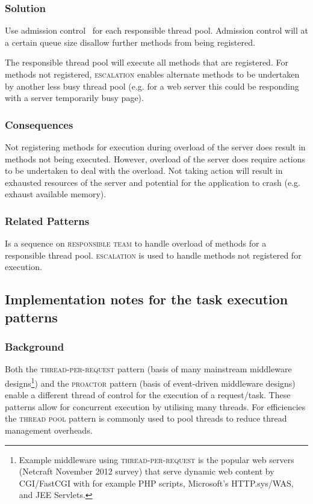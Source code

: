 \documentclass[prodmode]{style/acmlarge}
\begin{document}
\subsubsection*{\textbf{Solution}} Use admission control~\cite{seda} for each
responsible thread pool.  Admission control will at a certain queue size
disallow further methods from being registered.

The responsible thread pool will execute all methods that are registered.  For
methods not registered, \textsc{escalation} enables alternate methods to be
undertaken by another less busy thread pool (e.g. for a web server this could be
responding with a server temporarily busy page).

\subsubsection*{Consequences} Not registering methods for execution during
overload of the server does result in methods not being executed.  However,
overload of the server does require actions to be undertaken to deal with the
overload.  Not taking action will result in exhausted resources of the server
and potential for the application to crash (e.g. exhaust available memory).

\subsubsection*{Related Patterns} Is a sequence on \textsc{responsible team} to
handle overload of methods for a responsible thread pool.  \textsc{escalation}
is used to handle methods not registered for execution.



\subsection{\textbf{Implementation notes for the task execution patterns}}

\subsubsection*{Background}

Both the \textsc{thread-per-request} pattern \cite{thread-per-request} (basis of
many mainstream middleware designs\footnote{Example middleware using
\textsc{thread-per-request} is the popular web servers (Netcraft November 2012
survey) that serve dynamic web content by CGI/FastCGI with for example PHP scripts,
Microsoft's HTTP.sys/WAS, and JEE Servlets.}) and the \textsc{proactor} pattern
\cite{proactor} (basis of event-driven middleware designs) enable a different
thread of control for the execution of a request/task.  These patterns allow for
concurrent execution by utilising many threads.  For efficiencies the
\textsc{thread pool} pattern \cite{thread-per-request} is commonly used to pool
threads to reduce thread management overheads.
\end{document}
